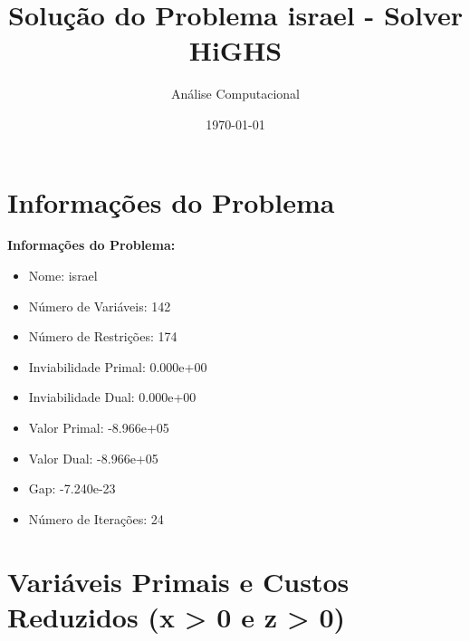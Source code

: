 \documentclass[12pt]{article}
\title{Solução do Problema israel - Solver HiGHS}
\author{Análise Computacional}
\date{\today}
\begin{document}
\maketitle

\section{Informações do Problema}

\textbf{Informações do Problema:}
\begin{itemize}
\item Nome: israel
\item Número de Variáveis: 142
\item Número de Restrições: 174
\item Inviabilidade Primal: 0.000e+00
\item Inviabilidade Dual: 0.000e+00
\item Valor Primal: -8.966e+05
\item Valor Dual: -8.966e+05
\item Gap: -7.240e-23
\item Número de Iterações: 24
\end{itemize}


\section{Variáveis Primais e Custos Reduzidos (x > 0 e z > 0)}
\end{document}
